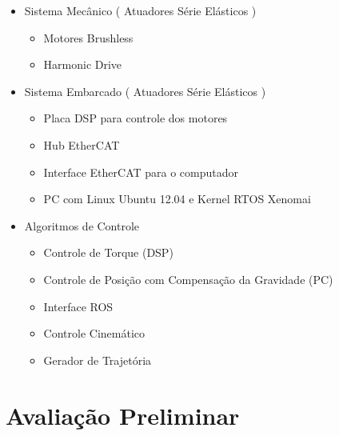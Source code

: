 \begin{itemize}
    \item Sistema Mecânico ( Atuadores Série Elásticos )
    \begin{itemize}
        \item Motores Brushless
        \item Harmonic Drive
    \end{itemize}
    \item Sistema Embarcado ( Atuadores Série Elásticos )
    \begin{itemize}
        \item Placa DSP para controle dos motores
        \item Hub EtherCAT
        \item Interface EtherCAT para o computador
        \item PC com Linux Ubuntu 12.04 e Kernel RTOS Xenomai
    \end{itemize}
    \item Algoritmos de Controle
    \begin{itemize}
        \item Controle de Torque (DSP)
        \item Controle de Posição com Compensação da Gravidade (PC)
        \item Interface ROS
        \item Controle Cinemático
        \item Gerador de Trajetória
    \end{itemize}
\end{itemize}





\section{Avaliação Preliminar}


